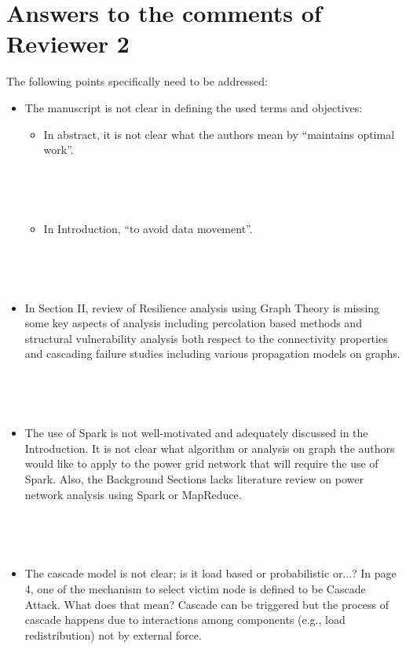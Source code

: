 \section{Answers to the comments of Reviewer 2}
%
%


The following points specifically need to be addressed:

\begin{itemize}
\item The manuscript is not clear in defining the used terms and objectives:
\begin{itemize}
\item In abstract, it is not clear what the authors mean by ``maintains optimal work''.

~


~

\item In Introduction, ``to avoid data movement''. 

~


~
\end{itemize}

\item In Section II, review of Resilience analysis using Graph Theory is missing some key aspects of analysis including
percolation based methods and structural vulnerability analysis both respect to the connectivity properties and
cascading failure studies including various propagation models on graphs.

~


~


\item The use of Spark is not well-motivated and adequately discussed in the Introduction. It is not clear what algorithm or analysis on graph the authors would like to apply to the power grid network that will require the use of Spark. 
Also, the Background Sections lacks literature review on power network analysis using Spark or MapReduce.

~


~

\item The cascade model is not clear; is it load based or probabilistic or...? In page 4, one of the mechanism to select victim node is defined to be Cascade Attack. What does that mean? Cascade can be triggered but the process of cascade happens due to interactions among components (e.g., load redistribution) not by external force.


\end{itemize}
